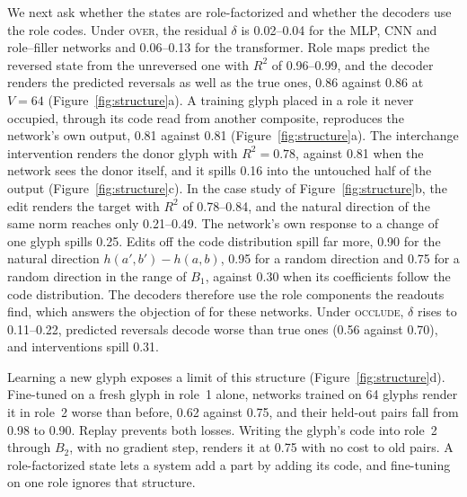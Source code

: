 \documentclass[10pt]{article}
\theoremstyle{plain}
\theoremstyle{remark}
\begin{document}
We next ask whether the states are role-factorized and whether the decoders use the role codes. Under \textsc{over}, the residual $\delta$ is 0.02--0.04 for the MLP, CNN and role--filler networks and 0.06--0.13 for the transformer. Role maps predict the reversed state from the unreversed one with $R^2$ of 0.96--0.99, and the decoder renders the predicted reversals as well as the true ones, 0.86 against 0.86 at $V = 64$ (Figure~\ref{fig:structure}a). A training glyph placed in a role it never occupied, through its code read from another composite, reproduces the network's own output, 0.81 against 0.81 (Figure~\ref{fig:structure}a). The interchange intervention renders the donor glyph with $R^2 = 0.78$, against 0.81 when the network sees the donor itself, and it spills 0.16 into the untouched half of the output (Figure~\ref{fig:structure}c). In the case study of Figure~\ref{fig:structure}b, the edit renders the target with $R^2$ of 0.78--0.84, and the natural direction of the same norm reaches only 0.21--0.49. The network's own response to a change of one glyph spills 0.25. Edits off the code distribution spill far more, 0.90 for the natural direction $h(a', b') - h(a, b)$, 0.95 for a random direction and 0.75 for a random direction in the range of $B_1$, against 0.30 when its coefficients follow the code distribution. The decoders therefore use the role components the readouts find, which answers the objection of \citet{fodor1990} for these networks. Under \textsc{occlude}, $\delta$ rises to 0.11--0.22, predicted reversals decode worse than true ones (0.56 against 0.70), and interventions spill 0.31.

Learning a new glyph exposes a limit of this structure (Figure~\ref{fig:structure}d). Fine-tuned on a fresh glyph in role~1 alone, networks trained on 64 glyphs render it in role~2 worse than before, 0.62 against 0.75, and their held-out pairs fall from 0.98 to 0.90. Replay prevents both losses. Writing the glyph's code into role~2 through $B_2$, with no gradient step, renders it at 0.75 with no cost to old pairs. A role-factorized state lets a system add a part by adding its code, and fine-tuning on one role ignores that structure.
\end{document}
